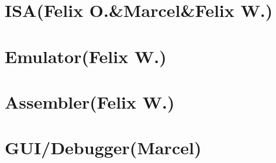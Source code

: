 
\section{ISA(Felix O.\&Marcel\&Felix W.)}
\section{Emulator(Felix W.)}
\section{Assembler(Felix W.)}
\section{GUI/Debugger(Marcel)}

